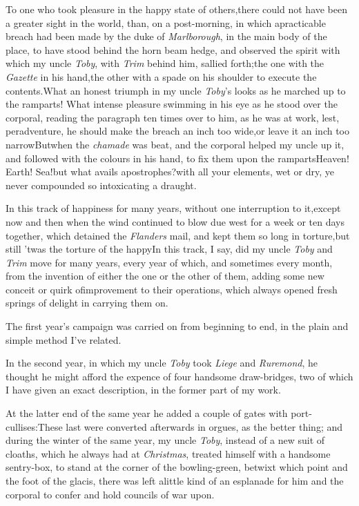 \documentclass{article}
\begin{document}
To one who took pleasure in the happy state of others,\tsk there
could not have been a greater sight in the world, than, on a
post-morning, in which a\break practicable breach had been made by the
duke of \textit{Marlborough}, in the main body of the place,\tsk
to have stood behind the horn beam hedge, and observed the
spirit with which my uncle \textit{Toby}, with \textit{Trim}
behind him, sallied forth;\tsh the one with the \textit{Gazette}
in his hand,\tsk the other with a spade on his shoulder to
execute the contents.\tsh What an honest triumph in my uncle
\textit{Toby}’s looks as he marched up to the ramparts! What
intense pleasure swimming in his eye as he stood over the
corporal, reading the paragraph ten times over to him, as he was
at work, lest, peradventure, he should make the breach an inch
too wide,\tsk or leave it an inch too narrow\tsh But\break when
the \textit{chamade} was beat, and the corporal helped my uncle
up it, and followed with the colours in his hand, to fix them
upon the ramparts\tsk Heaven! Earth!  Sea!\tsh but what avails
apostrophes?\tsh with all your elements, wet or dry, ye never
compounded so intoxicating a draught.

In this track of happiness for many years, without one
interruption to it,\break except now and then when the wind continued to
blow due west for a week or ten days together, which detained the
\textit{Flanders} mail, and kept them so long in torture,\tsk but
still ’twas the torture of the happy\tsh In this
track, I say, did my uncle \textit{Toby} and \textit{Trim} move for
many years, every year of which, and sometimes every
month, from the invention of either the one or the other of them,
adding some new conceit or quirk of\break improvement to their
operations, which always opened fresh springs of delight in
carrying them on.

The first year’s campaign was carried on from beginning to
end, in the plain and simple method I’ve related.

In the second year, in which my uncle \textit{Toby} took
\textit{Liege} and \textit{Ruremond}, he thought he might afford the
expence of four handsome draw-bridges, two of which I have given
an exact description, in the former part of my work.

At the latter end of the same year he added a couple of gates
with port-cullises:\tsh These last were converted\break
afterwards in orgues, as the better thing;
and during the winter of the same year, my uncle \textit{Toby},
instead of a new suit of cloaths, which he always had at
\textit{Christmas}, treated himself with a handsome sentry-box,
to stand at the corner of the bowling-green, betwixt which point
and the foot of the glacis, there was left a\break little kind of an
esplanade for him and the corporal to confer and hold councils
of war upon.
\end{document}

